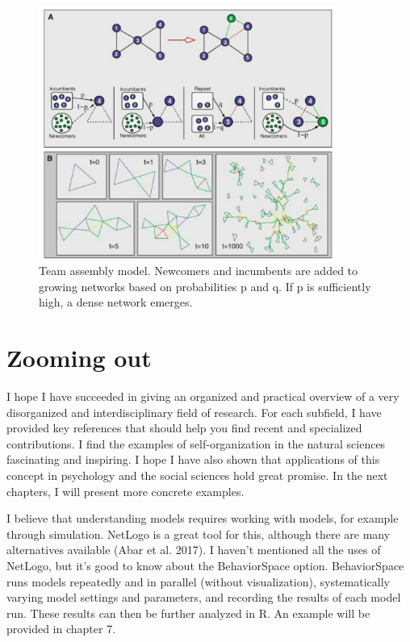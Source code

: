 \documentclass[
  letterpaper,
]{scrbook}
\begin{document}
\begin{figure}

{\centering \includegraphics[width=3.84275in,height=3.26591in]{media/ch4/image10.jpg}

}

\caption{\label{fig-ch4-img10}Team assembly model. Newcomers and
incumbents are added to growing networks based on probabilities p and q.
If p is sufficiently high, a dense network emerges.}

\end{figure}

\hypertarget{zooming-out}{%
\section{Zooming out}\label{zooming-out}}

I hope I have succeeded in giving an organized and practical overview of
a very disorganized and interdisciplinary field of research. For each
subfield, I have provided key references that should help you find
recent and specialized contributions. I find the examples of
self-organization in the natural sciences fascinating and inspiring. I
hope I have also shown that applications of this concept in psychology
and the social sciences hold great promise. In the next chapters, I will
present more concrete examples.

I believe that understanding models requires working with models, for
example through simulation. NetLogo is a great tool for this, although
there are many alternatives available (Abar et al. 2017). I haven't
mentioned all the uses of NetLogo, but it's good to know about the
BehaviorSpace option. BehaviorSpace runs models repeatedly and in
parallel (without visualization), systematically varying model settings
and parameters, and recording the results of each model run. These
results can then be further analyzed in R. An example will be provided
in chapter 7.
\end{document}

